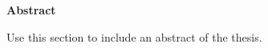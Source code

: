 \begin{center}
    \textbf{\Large Abstract}
\end{center}

Use this section to include an abstract of the thesis.

\newpage